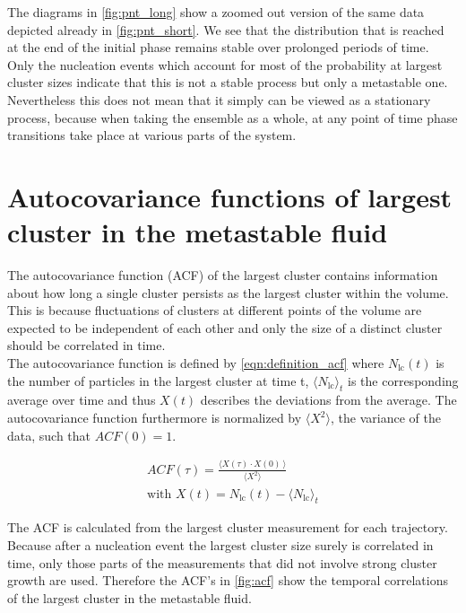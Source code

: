 The diagrams in \autoref{fig:pnt_long} show a zoomed out version of the same data depicted already in \autoref{fig:pnt_short}. We see that the distribution that is reached at the end of the initial phase remains stable over prolonged periods of time. Only the nucleation events which account for most of the probability at largest cluster sizes indicate that this is not a stable process but only a metastable one. Nevertheless this does not mean that it simply can be viewed as a stationary process, because when taking the ensemble as a whole, at any point of time phase transitions take place at various parts of the system.

\section{Autocovariance functions of largest cluster in the metastable fluid}
\label{sec:acf}
The autocovariance function (ACF) of the largest cluster contains information about how long a single cluster persists as the largest cluster within the volume. This is because fluctuations of clusters at different points of the volume are expected to be independent of each other and only the size of a distinct cluster should be correlated in time.\\

The autocovariance function is defined by \autoref{eqn:definition_acf} where $N_{\text{lc}}(t)$ is the number of particles in the largest cluster at time t, $\langle N_{\text{lc}} \rangle_t$ is the corresponding average over time and thus $X(t)$ describes the deviations from the average. The autocovariance function furthermore is normalized by ${ \langle X^2  \rangle }$, the variance of the data, such that $ACF(0) = 1 $.

\begin{align}
\label{eqn:definition_acf} 
ACF(\tau)=\frac{ \langle  X(\tau) \cdot  X(0) \! \: \rangle }{ \langle X^2  \rangle }\\  
\text{with } X(t)=N_{\text{lc}}(t)- \langle N_{\text{lc}} \rangle_t 
\end{align}

The ACF is calculated from the largest cluster measurement for each trajectory. Because after a nucleation event the largest cluster size surely is correlated in time, only those parts of the measurements that did not involve strong cluster growth are used. Therefore the ACF's in \autoref{fig:acf} show the temporal correlations of the largest cluster in the metastable fluid.\\

